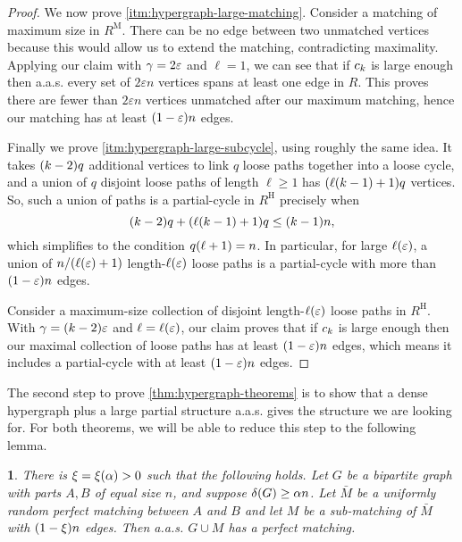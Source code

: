 \documentclass[11pt,english]{article}
\theoremstyle{plain}
\theoremstyle{definition}
\theoremstyle{definition}
\theoremstyle{plain}
\theoremstyle{plain}
\theoremstyle{plain}
\newtheorem{lem}[thm]{\protect\lemmaname}
\theoremstyle{plain}
\theoremstyle{remark}
\theoremstyle{remark}
\let\originalleft\left
\let\originalright\right
\renewcommand{\left}{\mathopen{}\mathclose\bgroup\originalleft}
\renewcommand{\right}{\aftergroup\egroup\originalright}
\providecommand{\lemmaname}{Lemma}
\begin{document}
\begin{proof}
We now prove \ref{itm:hypergraph-large-matching}. Consider a matching of maximum size in $R^{\mathrm{M}}$.
There can be no edge between two unmatched vertices because this would
allow us to extend the matching, contradicting maximality. Applying
our claim with $\gamma=2\varepsilon$ and $\ell=1$, we can see that
if $c_{k}$ is large enough then
a.a.s. every set of $2\varepsilon n$ vertices spans at least one
edge in $R$. This proves there are fewer than \emph{$2\varepsilon n$}
vertices unmatched after our maximum matching, hence our matching
has at least $\left(1-\varepsilon\right)n$ edges.

Finally we prove \ref{itm:hypergraph-large-subcycle}, using roughly the same idea. It takes $\left(k-2\right)q$ additional
vertices to link $q$ loose paths together into a loose cycle, and
a union of $q$ disjoint loose paths of length $\ell\ge1$ has $\left(\ell\left(k-1\right)+1\right)q$
vertices. So, such a union of paths is a partial-cycle in $R^{\mathrm{H}}$
precisely when 
\[
\left(k-2\right)q+\left(\ell\left(k-1\right)+1\right)q\le\left(k-1\right)n,
\]
which simplifies to the condition $q\left(\ell+1\right)=n$. In particular,
for large $\ell\left(\varepsilon\right)$, a union of $n/\left(\ell\left(\varepsilon\right)+1\right)$
length-$\ell\left(\varepsilon\right)$ loose paths is a partial-cycle
with more than $\left(1-\varepsilon\right)n$ edges.

Consider a maximum-size collection of disjoint length-$\ell\left(\varepsilon\right)$
loose paths in $R^{\mathrm{H}}$. With $\patheps=\left(k-2\right)\varepsilon$ and
$\ell=\ell\left(\varepsilon\right)$, our claim proves that if $c_{k}$ is large enough then our maximal
collection of loose paths has at least $\left(1-\varepsilon\right)n$
edges, which means it includes a partial-cycle with at least $\left(1-\varepsilon\right)n$
edges.
\end{proof}
The second step to prove \ref{thm:hypergraph-theorems} is to show that a dense
hypergraph plus a large partial structure a.a.s. gives the structure
we are looking for. For both theorems, we will be able to reduce this
step to the following lemma.
\begin{lem}
\label{lem:bipartite-plus-big-matching-perfect}There is $\xi=\xi\left(\alpha\right)>0$ 
such that the following holds. Let $G$ be a bipartite graph with
parts $A,B$ of equal size $n$, and suppose $\delta\left(G\right)\ge\alpha n$.
Let $\bar{M}$ be a uniformly random perfect matching between $A$
and $B$ and let $M$ be a sub-matching of $\bar{M}$ with $\left(1-\xi\right) n$
edges. Then a.a.s. $G\cup M$ has a perfect matching. 
\end{lem}
\end{document}
